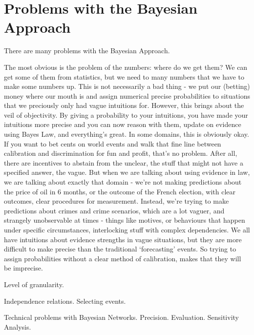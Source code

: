 \section{Problems with the Bayesian Approach}
There are many problems with the Bayesian Approach.

The most obvious is the problem of the numbers: where do we get them? We can get some of them from statistics, but we need to many numbers that we have to make some numbers up. This is not necessarily a bad thing - we put our (betting) money where our mouth is and assign numerical precise probabilities to situations that we preciously only had vague intuitions for. However, this brings about the veil of objectivity. By giving a probability to your intuitions, you have made your intuitions more precise and you can now reason with them, update on evidence using Bayes Law, and everything's great. In some domains, this is obviously okay. If you want to bet cents on world events and walk that fine line between calibration and discrimination for fun and profit, that's no problem.  After all, there are incentives to abstain from the unclear, the stuff that might not have a specified answer, the vague. But when we are talking about using evidence in law, we are talking about exactly that domain - we're not making predictions about the price of oil in 6 months, or the outcome of the French election, with clear outcomes, clear procedures for measurement. Instead, we're trying to make predictions about crimes and crime scenarios, which are a lot vaguer, and strangely unobservable at times - things like motives, or behaviours that happen under specific circumstances, interlocking stuff with complex dependencies. We all have intuitions about evidence strengths in vague situations, but they are more difficult to make precise than the traditional `forecasting' events. So trying to assign probabilities without a clear method of calibration, makes that they will be imprecise.

Level of granularity.

Independence relations. Selecting events.

Technical problems with Bayesian Networks. Precision. Evaluation. Sensitivity Analysis.


 



